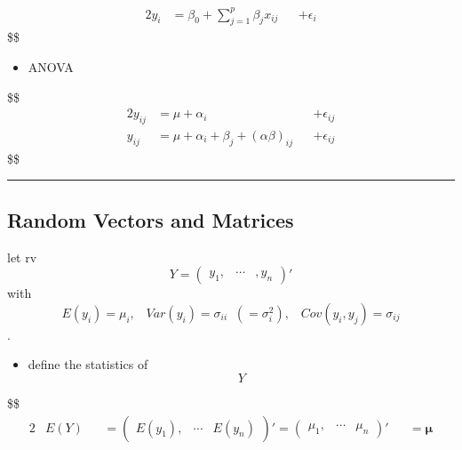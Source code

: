 \documentclass[
]{book}
\providecommand{\tightlist}{%
  \setlength{\itemsep}{0pt}\setlength{\parskip}{0pt}}
\begin{document}
{{{\begin{alignat}{2}
y_i &= \beta_0 + \sum_{j=1}^p \beta_j x_{ij} &&+ \epsilon_i \tag{Multiple}


\end{alignat}
\$\$

\begin{itemize}
\tightlist
\item
  ANOVA
\end{itemize}

\$\$
\begin{alignat}{2}

y_{ij} &= \mu + \alpha_i &&+ \epsilon_{ij} \tag{One-Way} 

\\

y_{ij} &= \mu + \alpha_i + \beta_j + (\alpha \beta)_{ij} &&+ \epsilon_{ij} \tag{Two-Way with interaction}



\end{alignat}
\$\$

\begin{center}\rule{0.5\linewidth}{0.5pt}\end{center}

\hypertarget{random-vectors-and-matrices}{%
\subsection{Random Vectors and Matrices}\label{random-vectors-and-matrices}}

let rv \[Y = \begin{pmatrix} y_1, & \cdots &, y_n \end{pmatrix}'\] with \[E(y_i) = \mu_i , \; \; \; Var(y_i)=\sigma_{ii} \; \; (=\sigma_i^2), \; \; \; Cov(y_i , y_j) = \sigma_{ij}\].

\begin{itemize}
\tightlist
\item
  define the statistics of \[Y\]
\end{itemize}

\$\$
\begin{alignat}{2}


&E(Y) &&= \begin{pmatrix} E(y_1), & \cdots & E(y_n) \end{pmatrix}' = \begin{pmatrix} \mu_1, & \cdots & \mu_n \end{pmatrix}' &&= \pmb \mu \tag{Expected Value of Y elementwise as } 

\\


\end{alignat}}}}
\end{document}
